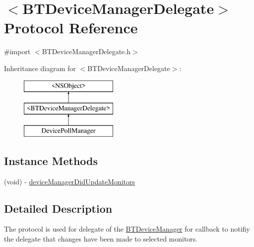 \hypertarget{protocol_b_t_device_manager_delegate-p}{\section{$<$B\-T\-Device\-Manager\-Delegate$>$ Protocol Reference}
\label{protocol_b_t_device_manager_delegate-p}
}


{\ttfamily \#import $<$B\-T\-Device\-Manager\-Delegate.\-h$>$}

Inheritance diagram for $<$B\-T\-Device\-Manager\-Delegate$>$\-:\begin{figure}[H]
\begin{center}
\leavevmode
\includegraphics[height=3.000000cm]{protocol_b_t_device_manager_delegate-p}
\end{center}
\end{figure}
\subsection*{Instance Methods}
\begin{DoxyCompactItemize}
\item 
(void) -\/ \hyperlink{protocol_b_t_device_manager_delegate-p_afc2437f8a5b807ef0c173afb08af7fef}{device\-Manager\-Did\-Update\-Monitors}
\end{DoxyCompactItemize}


\subsection{Detailed Description}
The protocol is used for delegate of the \hyperlink{interface_b_t_device_manager}{B\-T\-Device\-Manager} for callback to notifiy the delegate that changes have been made to selected monitors. 

